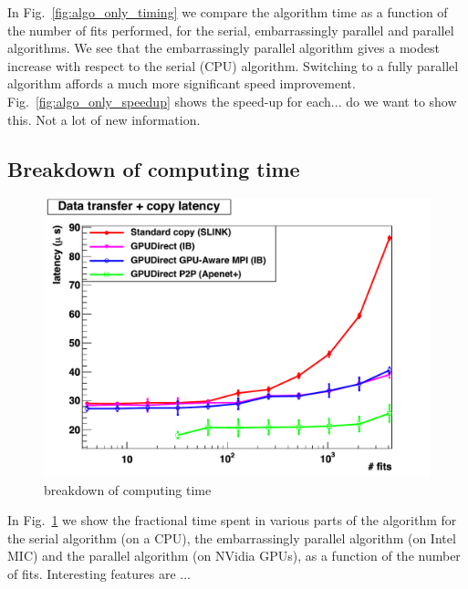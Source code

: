 \documentclass[letterpaper]{jpconf}
\begin{document}
In Fig.~\ref{fig:algo_only_timing} we compare the algorithm time as a
function of the number of fits performed, for the serial,
embarrassingly parallel and parallel algorithms. We see that the
embarrassingly parallel algorithm gives a modest increase with respect
to the serial (CPU) algorithm. Switching to a fully parallel algorithm
affords a much more significant speed
improvement. Fig.~\ref{fig:algo_only_speedup} shows the speed-up for
each... do we want to show this. Not a lot of new information.

\subsection{Breakdown of computing time}
\begin{figure}[tbp]
  \centering
  \includegraphics[width=0.9\linewidth]{../../2012/figures/DT_MC_SLINK_IB_APE_low}
  \caption{breakdown of computing time}
  \label{fig:breakdown}
\end{figure}
In Fig.~\ref{fig:breakdown} we show the fractional time spent in
various parts of the algorithm for the serial algorithm (on a CPU),
the embarrassingly parallel algorithm (on Intel MIC) and the parallel
algorithm (on NVidia GPUs), as a function of the number of
fits. Interesting features are ...
\end{document}
